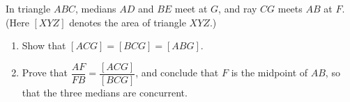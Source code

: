 In triangle $ABC$, medians $AD$ and $BE$ meet at $G$, and ray $CG$ meets $AB$ at $F$. (Here $[XYZ]$ denotes the area of triangle $XYZ$.)
\begin{enumerate}
\item[(a)] Show that $[ACG]=[BCG]=[ABG]$.
\item[(b)] Prove that $\dfrac{AF}{FB}=\dfrac{[ACG]}{[BCG]}$, and conclude that $F$ is the midpoint of $AB$, so that the three medians are concurrent.
\end{enumerate}
